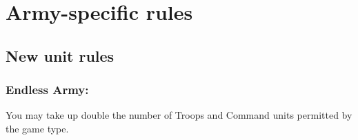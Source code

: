 \newcommand{\AntiTankCannon}[1][5+]{\textbf{Anti-Tank Cannon}: R8-40 {#1} D8 [Critical 8+, Deadly D10+2, Heavy, Slow]}
\newcommand{\ArtilleryCannon}[1][5+]{\textbf{Artillery Cannon}: R8-80 {#1} D5 [Area Effect 8, Heavy, Indirect Fire, Slow, Suppressive 1]}
\newcommand{\Autocannon}[1][5+]{\textbf{Autocannon}: R30 {#1} D4 [Deadly 2, Heavy, Rapid 2, Slow]}
\newcommand{\GatlingCannon}[1][5+]{\textbf{Gatling Cannon}: R30 {#1} D2 [Heavy, Rapid 7 Suppressive 3]}
\newcommand{\HeavyFlamethrower}{\textbf{Heavy Flamethrower}: R8 Autohit D2 [Assault, Slow, Spray 5, Terrifying 2]}
\newcommand{\HeavyMachineGun}[1][5+]{\textbf{Heavy Machine Gun}: R20 {#1} D2 [Heavy, Rapid 3, Suppressive 1]}
\newcommand{\GiantFlamethrower}{\textbf{Giant Flamethrower}: R10 Autohit D2 [Assault, Slow, Spray 8, Terrifying 2]}
\newcommand{\LongRangeCannon}[1][5+]{\textbf{Long-Range Cannon}: R8-40 {#1} D5 [Area Effect 6, Deadly 3, Heavy, Slow]}
\newcommand{\MagmaCannon}[1][5+]{\textbf{Magma Cannon}: R16 {#1} D8 [Critical 8+, Deadly 2D5, Heavy, Slow]}
\newcommand{\MissileLauncher}[1][5+]{\textbf{Missile Launcher}: Choose a type each time it fires:
\begin{itemize}
    \item Frag missile: R40 {#1} D1 [Area Effect 4, Heavy, Slow]
    \item Anti-tank missile: R40 {#1} D6 [Deadly D10, Heavy, Slow]
\end{itemize}
}
\newcommand{\PlasmaCannon}[1][5+]{\textbf{Plasma Cannon}: R30 {#1} D6, [Area Effect 3, Deadly 2, Heavy, Unstable 1]}
\newcommand{\SiegeCannon}[1][5+]{\textbf{Siege Cannon} R4-20 {#1} D8 [Area Effect 8, Deadly D5+3, Heavy, Slow, Terrifying 1]}






\section*{Army-specific rules}

\subsection*{New unit rules}

\subsubsection*{Endless Army:} You may take up double the number of Troops and Command units permitted by the game type.

